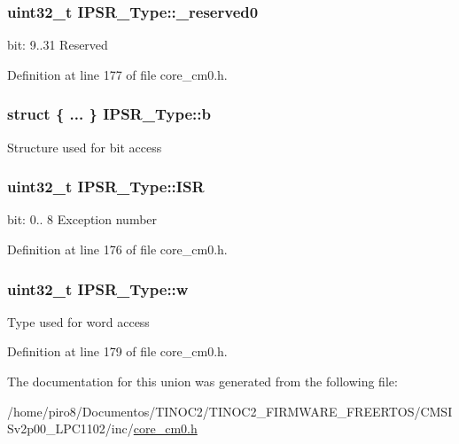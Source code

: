 \subsubsection[{\texorpdfstring{\+\_\+reserved0}{_reserved0}}]{\setlength{\rightskip}{0pt plus 5cm}uint32\+\_\+t I\+P\+S\+R\+\_\+\+Type\+::\+\_\+reserved0}\hypertarget{union_i_p_s_r___type_ad2eb0a06de4f03f58874a727716aa9aa}{}\label{union_i_p_s_r___type_ad2eb0a06de4f03f58874a727716aa9aa}
bit\+: 9..31 Reserved 

Definition at line 177 of file core\+\_\+cm0.\+h.

\subsubsection[{\texorpdfstring{b}{b}}]{\setlength{\rightskip}{0pt plus 5cm}struct \{ ... \}   I\+P\+S\+R\+\_\+\+Type\+::b}\hypertarget{union_i_p_s_r___type_add0d6497bd50c25569ea22b48a03ec50}{}\label{union_i_p_s_r___type_add0d6497bd50c25569ea22b48a03ec50}
Structure used for bit access 
\subsubsection[{\texorpdfstring{I\+SR}{ISR}}]{\setlength{\rightskip}{0pt plus 5cm}uint32\+\_\+t I\+P\+S\+R\+\_\+\+Type\+::\+I\+SR}\hypertarget{union_i_p_s_r___type_ab46e5f1b2f4d17cfb9aca4fffcbb2fa5}{}\label{union_i_p_s_r___type_ab46e5f1b2f4d17cfb9aca4fffcbb2fa5}
bit\+: 0.. 8 Exception number 

Definition at line 176 of file core\+\_\+cm0.\+h.

\subsubsection[{\texorpdfstring{w}{w}}]{\setlength{\rightskip}{0pt plus 5cm}uint32\+\_\+t I\+P\+S\+R\+\_\+\+Type\+::w}\hypertarget{union_i_p_s_r___type_a4adca999d3a0bc1ae682d73ea7cfa879}{}\label{union_i_p_s_r___type_a4adca999d3a0bc1ae682d73ea7cfa879}
Type used for word access 

Definition at line 179 of file core\+\_\+cm0.\+h.



The documentation for this union was generated from the following file\+:\begin{DoxyCompactItemize}
\item 
/home/piro8/\+Documentos/\+T\+I\+N\+O\+C2/\+T\+I\+N\+O\+C2\+\_\+\+F\+I\+R\+M\+W\+A\+R\+E\+\_\+\+F\+R\+E\+E\+R\+T\+O\+S/\+C\+M\+S\+I\+Sv2p00\+\_\+\+L\+P\+C1102/inc/\hyperlink{core__cm0_8h}{core\+\_\+cm0.\+h}\end{DoxyCompactItemize}
